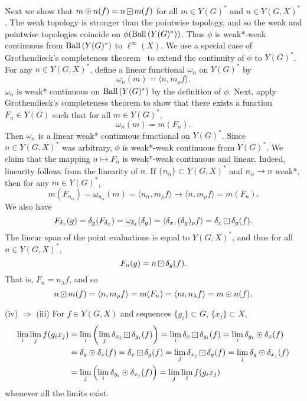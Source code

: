 Next we show that $m\odot n(f) = n\dotbox m(f)$ for all $m\in Y(G)^*$ and $n\in Y(G,X)^*$.
The weak topology is stronger than the pointwise topology, and so
the weak and pointwise topologies coincide on $\phi(\operatorname{Ball\,}(Y(G)^*))$.  Thus
$\phi$ is weak*-weak continuous from $\operatorname{Ball\,}(Y(G)^*)$ to $\ell^\infty (X)$.
We use a special case of Grothendieck's completeness theorem~\cite[Proposition A.8]{milnes}
to extend the continuity of $\phi$ to $Y(G)^*$.
For any $n\in Y(G,X)^*$, define a linear functional $\omega_n$ on $Y(G)^*$ by
\[
\omega_n(m) = \langle n, m_\rho f\rangle.
\]
$\omega_n$ is weak* continuous on $\operatorname{Ball\,}(Y(G)^*)$ by the definition of $\phi$.
Next, apply Grothendieck's completeness theorem to show that there exists a function $F_n\in Y(G)$
such that for all $m\in Y(G)^*$,
\[
\omega_n(m) = m(F_n).
\]
Then $\omega_n$ is a linear weak* continuous functional on $Y(G)^*$.
Since $n\in Y(G,X)^*$ was arbitrary, $\phi$ is weak*-weak continuous from
$Y(G)^*$.
We claim that the mapping $n\mapsto F_n$ is weak*-weak continuous and linear.  Indeed, linearity follows
from the linearity of $n$.  If $\{n_\alpha\}\subset Y(G,X)^*$ and $n_\alpha \rightarrow n$ weak*,
then for any $m\in Y(G)^*$,
\[
m(F_{n_\alpha}) = \omega_{n_\alpha}(m) = \langle n_\alpha, m_\rho f \rangle \rightarrow \langle n, m_\rho f\rangle = m(F_n).
\]
We also have
\[
F_{\delta_x}(g) = \delta_g (F_{\delta_x}) = \omega_{\delta_x}(\delta_g) = \langle \delta_x, (\delta_g)_\rho f\rangle = \delta_x \dotbox \delta_g(f).
\]
The linear span of the point evaluations is equal to $Y(G,X)^*$, and thus for all $n\in Y(G,X)^*$,
\[
F_n (g) = n\dotbox \delta_g (f).
\]
That is, $F_n = n_\lambda f$, and so
\[
n\dotbox m (f) = \langle n, m_\rho f \rangle = m(F_n) = \langle m, n_\lambda f \rangle = m\odot n (f).
\]

(iv) $\Rightarrow$ (iii) For $f\in Y(G,X)$ and sequences $\{g_i\}\subset G$, $\{x_j\}\subset X$,
\begin{align*}
\lim_i \lim_j f(g_i x_j) &= \lim_i \left(\lim_j \delta_{x_j}\dotbox\delta_{g_i}(f)\right) = \lim_i \delta_x \dotbox \delta_{g_i} (f)
= \lim_i \delta_{g_i} \odot \delta_x (f) \\
&= \delta_g \odot \delta_x (f) = \delta_x \dotbox \delta_g (f)= \lim_j \delta_{x_j} \dotbox \delta_g (f) =\lim_j \delta_g \odot \delta_{x_j}(f)\\
&= \lim_j \left( \lim_i \delta_{g_i} \odot \delta_{x_j} (f) \right) = \lim_j \lim_i f(g_i x_j)
\end{align*}
whenever all the limits exist.
\done

